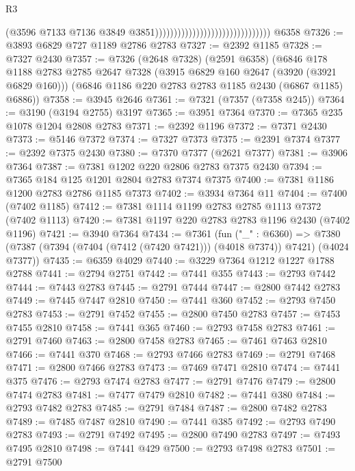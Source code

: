 \begin{lexlean}{R3}
\begin{coremodule}
                                                                (@3596
                                                                  @7133
                                                                  @7136
                                                                  @3849
                                                                  @3851)))))))))))))))))))))))))))))))
    @6358
@7326 := @3893 @6829 @727 @1189 @2786 @2783
@7327 := @2392 @1185
@7328 := @7327 @2430
@7357 := @7326
    (@2648 @7328)
    (@2591 @6358)
    (@6846
      @178
      @1188
      @2783
      @2785
      @2647
      @7328
      (@3915 @6829 @160 @2647 (@3920 (@3921 @6829 @160)))
      (@6846 @1186 @220 @2783 @2783 @1185 @2430 (@6867 @1185) @6886))
@7358 := @3945 @2646
@7361 := @7321 (@7357 (@7358 @245))
@7364 := @3190 (@3194 @2755) @3197
@7365 := @3951 @7364
@7370 := @7365 @235 @1078 @1204 @2808 @2783
@7371 := @2392 @1196
@7372 := @7371 @2430
@7373 := @5146 @7372
@7374 := @7327 @7373
@7375 := @2391 @7374
@7377 := @2392 @7375 @2430
@7380 := @7370 @7377 (@2621 @7377)
@7381 := @3906 @7364
@7387 := @7381 @1202 @220 @2806 @2783 @7375 @2430
@7394 := @7365 @184 @125 @1201 @2804 @2783 @7374 @7375
@7400 := @7381 @1186 @1200 @2783 @2786 @1185 @7373
@7402 := @3934 @7364 @11
@7404 := @7400 (@7402 @1185)
@7412 := @7381 @1114 @1199 @2783 @2785 @1113 @7372 (@7402 @1113)
@7420 := @7381 @1197 @220 @2783 @2783 @1196 @2430 (@7402 @1196)
@7421 := @3940 @7364
@7434 := @7361
    (fun ("_" : @6360) =>
    @7380 (@7387 (@7394 (@7404 (@7412 (@7420 @7421))) (@4018 @7374)) @7421) (@4024 @7377))
@7435 := @6359 @4029
@7440 := @3229 @7364 @1212 @1227 @1788 @2788
@7441 := @2794 @2751
@7442 := @7441 @355
@7443 := @2793 @7442
@7444 := @7443 @2783
@7445 := @2791 @7444
@7447 := @2800 @7442 @2783
@7449 := @7445 @7447 @2810
@7450 := @7441 @360
@7452 := @2793 @7450 @2783
@7453 := @2791 @7452
@7455 := @2800 @7450 @2783
@7457 := @7453 @7455 @2810
@7458 := @7441 @365
@7460 := @2793 @7458 @2783
@7461 := @2791 @7460
@7463 := @2800 @7458 @2783
@7465 := @7461 @7463 @2810
@7466 := @7441 @370
@7468 := @2793 @7466 @2783
@7469 := @2791 @7468
@7471 := @2800 @7466 @2783
@7473 := @7469 @7471 @2810
@7474 := @7441 @375
@7476 := @2793 @7474 @2783
@7477 := @2791 @7476
@7479 := @2800 @7474 @2783
@7481 := @7477 @7479 @2810
@7482 := @7441 @380
@7484 := @2793 @7482 @2783
@7485 := @2791 @7484
@7487 := @2800 @7482 @2783
@7489 := @7485 @7487 @2810
@7490 := @7441 @385
@7492 := @2793 @7490 @2783
@7493 := @2791 @7492
@7495 := @2800 @7490 @2783
@7497 := @7493 @7495 @2810
@7498 := @7441 @429
@7500 := @2793 @7498 @2783
@7501 := @2791 @7500

\end{coremodule}
\end{lexlean}
